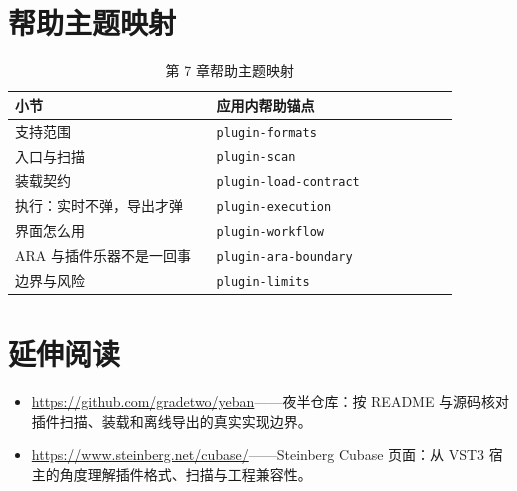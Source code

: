 \section{帮助主题映射}

\begin{table}[htbp]
\centering
\small
\begin{tabular}{@{}p{0.40\linewidth}p{0.48\linewidth}@{}}
\hline
小节 & 应用内帮助锚点 \\
\hline
支持范围 & \texttt{plugin-formats} \\
入口与扫描 & \texttt{plugin-scan} \\
装载契约 & \texttt{plugin-load-contract} \\
执行：实时不弹，导出才弹 & \texttt{plugin-execution} \\
界面怎么用 & \texttt{plugin-workflow} \\
ARA 与插件乐器不是一回事 & \texttt{plugin-ara-boundary} \\
边界与风险 & \texttt{plugin-limits} \\
\hline
\end{tabular}
\caption{第 7 章帮助主题映射}
\end{table}

\section*{延伸阅读}
\begin{itemize}[leftmargin=1.5em]
\item \url{https://github.com/gradetwo/yeban}——夜半仓库：按 README 与源码核对插件扫描、装载和离线导出的真实实现边界。
\item \url{https://www.steinberg.net/cubase/}——Steinberg Cubase 页面：从 VST3 宿主的角度理解插件格式、扫描与工程兼容性。
\end{itemize}

